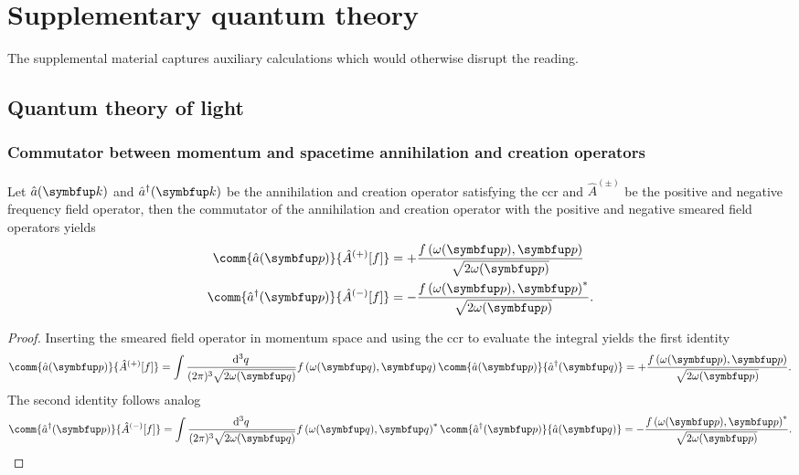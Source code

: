 \chapter{Supplementary quantum theory}

The supplemental material captures auxiliary calculations which would otherwise disrupt the reading.

\section{Quantum theory of light}

\subsection{Commutator between momentum and spacetime annihilation and creation operators}

\begin{lemma}\label{th:annihilation_field_commutators}
	Let $\hat{a}(\vb{k})$ and $\hat{a}^\dagger(\vb{k})$ be the annihilation and creation operator satisfying the \gls{ccr} and $\hat{A}^{(\pm)}$ be the positive and negative frequency field operator, then the commutator of the annihilation and creation operator with the positive and negative smeared field operators yields
	\begin{align}
		\comm{\hat{a}(\vb{p})}{\hat{A}^{(+)}[f]}
		&=
		+\frac{f\left(\omega(\vb{p}),\vb{p}\right)}{\sqrt{2\omega(\vb{p})}}
		\\
		\comm{\hat{a}^\dagger(\vb{p})}{\hat{A}^{(-)}[f]}
		&=
		-\frac{f\left(\omega(\vb{p}),\vb{p}\right)^*}{\sqrt{2\omega(\vb{p})}}
		.
	\end{align}
\end{lemma}
\begin{proof}
	Inserting the smeared field operator in momentum space and using the \gls{ccr} to evaluate the integral yields the first identity
	\begin{equation}
		\comm{\hat{a}(\vb{p})}{\hat{A}^{(+)}[f]}
		=
		\int\frac{\dd[3]{q}}{(2\pi)^3\sqrt{2\omega(\vb{q})}}
		f\left(\omega(\vb{q}),\vb{q}\right)
		\comm{\hat{a}(\vb{p})}{\hat{a}^\dagger(\vb{q})}
		=
		+\frac{f\left(\omega(\vb{p}),\vb{p}\right)}{\sqrt{2\omega(\vb{p})}}
		.
	\end{equation}
	The second identity follows analog
	\begin{equation}
		\comm{\hat{a}^\dagger(\vb{p})}{\hat{A}^{(-)}[f]}
		=
		\int\frac{\dd[3]{q}}{(2\pi)^3\sqrt{2\omega(\vb{q})}}
		f\left(\omega(\vb{q}),\vb{q}\right)^*
		\comm{\hat{a}^\dagger(\vb{p})}{\hat{a}(\vb{q})}
		=
		-\frac{f\left(\omega(\vb{p}),\vb{p}\right)^*}{\sqrt{2\omega(\vb{p})}}
		.
	\end{equation}
\end{proof}

